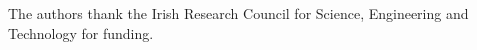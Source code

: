 \documentclass[preprint]{sigplanconf} %
\theoremstyle{remark}
\begin{document}
%
%
%
%
\acks

The authors thank the Irish Research Council for Science, Engineering and
Technology for funding.




\end{document}
